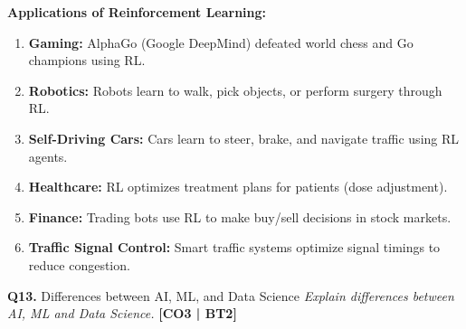 \documentclass[12pt,a4paper]{article}
\newcommand{\Qno}[1]{\textbf{\color{darkred}Q#1.}}
\newcommand{\term}[1]{\textbf{\color{headingcolor}#1}}
\begin{document}
\begin{answerenv}
\vspace{6pt}
\textbf{\color{headingcolor}Applications of Reinforcement Learning:}
\begin{enumerate}[leftmargin=1.8em, itemsep=3pt]
  \item \term{Gaming:} AlphaGo (Google DeepMind) defeated world chess and Go champions using RL.
  \item \term{Robotics:} Robots learn to walk, pick objects, or perform surgery through RL.
  \item \term{Self-Driving Cars:} Cars learn to steer, brake, and navigate traffic using RL agents.
  \item \term{Healthcare:} RL optimizes treatment plans for patients (dose adjustment).
  \item \term{Finance:} Trading bots use RL to make buy/sell decisions in stock markets.
  \item \term{Traffic Signal Control:} Smart traffic systems optimize signal timings to reduce congestion.
\end{enumerate}

\end{answerenv}

\vspace{8pt}

\begin{questionbox}{\Qno{13} Differences between AI, ML, and Data Science}
\textit{Explain differences between AI, ML and Data Science.} \hfill \textbf{[CO3 | BT2]}
\end{questionbox}
\end{document}
